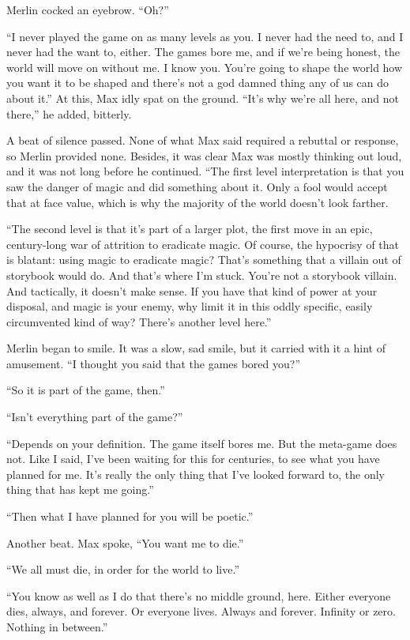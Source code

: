 Merlin cocked an eyebrow. “Oh?”

“I never played the game on as many levels as you. I never had the need to, and I never had the want to, either. The games bore me, and if we’re being honest, the world will move on without me. I know you. You’re going to shape the world how you want it to be shaped and there’s not a god damned thing any of us can do about it.” At this, Max idly spat on the ground. “It’s why we’re all here, and not there,” he added, bitterly.

A beat of silence passed. None of what Max said required a rebuttal or response, so Merlin provided none. Besides, it was clear Max was mostly thinking out loud, and it was not long before he continued. “The first level interpretation is that you saw the danger of magic and did something about it. Only a fool would accept that at face value, which is why the majority of the world doesn’t look farther.

“The second level is that it’s part of a larger plot, the first move in an epic, century-long war of attrition to eradicate magic. Of course, the hypocrisy of that is blatant: using magic to eradicate magic? That’s something that a villain out of storybook would do. And that’s where I’m stuck. You’re not a storybook villain. And tactically, it doesn’t make sense. If you have that kind of power at your disposal, and magic is your enemy, why limit it in this oddly specific, easily circumvented kind of way? There’s another level here.”

Merlin began to smile. It was a slow, sad smile, but it carried with it a hint of amusement. “I thought you said that the games bored you?”

“So it is part of the game, then.”

“Isn’t everything part of the game?”

“Depends on your definition. The game itself bores me. But the meta-game does not. Like I said, I’ve been waiting for this for centuries, to see what you have planned for me. It’s really the only thing that I’ve looked forward to, the only thing that has kept me going.”

“Then what I have planned for you will be poetic.”

Another beat. Max spoke, “You want me to die.”

“We all must die, in order for the world to live.”

“You know as well as I do that there’s no middle ground, here. Either everyone dies, always, and forever. Or everyone lives. Always and forever. Infinity or zero. Nothing in between.”

